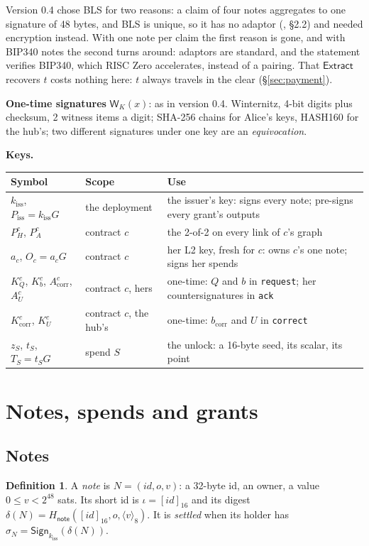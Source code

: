 \documentclass[11pt]{article}
\theoremstyle{plain}
\theoremstyle{definition}
\newtheorem{definition}{Definition}
\newcommand{\bcorr}{b_{\mathrm{corr}}}
\newcommand{\tx}[1]{\texttt{#1}}
\newcommand{\be}[2]{\langle #1\rangle_{#2}}
\newcommand{\pre}[2]{[#1]_{#2}}
\newcommand{\Ht}[1]{H_{\textsf{#1}}}
\newcommand{\Sign}{\mathsf{Sign}}
\newcommand{\Extr}{\mathsf{Extract}}
\newcommand{\Wots}{\mathsf{W}}
\newcommand{\kiss}{k_{\mathrm{iss}}}
\newcommand{\Piss}{P_{\mathrm{iss}}}
\newcommand{\PH}{P_H^{c}}
\newcommand{\Oc}{O_c}
\newcommand{\KQ}{K_{Q}^{c}}
\newcommand{\Kb}{K_{b}^{c}}
\newcommand{\Kcorr}{K_{\mathrm{corr}}^{c}}
\newcommand{\KU}{K_{U}^{c}}
\newcommand{\Acorr}{A_{\mathrm{corr}}^{c}}
\newcommand{\AU}{A_{U}^{c}}
\begin{document}
Version 0.4 chose BLS for two reasons: a claim of four notes aggregates
to one signature of 48 bytes, and BLS is unique, so it has no adaptor
(\cite{grants04}, \S2.2) and needed encryption instead. With one note
per claim the first reason is gone, and with BIP340 notes the second
turns around: adaptors are standard, and the statement verifies
BIP340, which RISC Zero accelerates, instead of a pairing. That $\Extr$
recovers $t$ costs nothing here: $t$ always travels in the clear
(\S\ref{sec:payment}).

\textbf{One-time signatures} $\Wots_K(x)$: as in version 0.4. Winternitz,
4-bit digits plus checksum, 2 witness items a digit; SHA-256 chains for
Alice's keys, HASH160 for the hub's; two different signatures under one
key are an \emph{equivocation}.

\textbf{Keys.}
\begin{center}
\begin{tabularx}{\linewidth}{llL}
\toprule
Symbol & Scope & Use \\
\midrule
$\kiss$, $\Piss = \kiss G$ & the deployment & the issuer's key: signs every note; pre-signs every grant's outputs \\
$\PH$, $P_A^c$ & contract $c$ & the 2-of-2 on every link of $c$'s graph \\
$a_c$, $\Oc = a_cG$ & contract $c$ & her L2 key, fresh for $c$: owns $c$'s one note; signs her spends \\
$\KQ$, $\Kb$, $\Acorr$, $\AU$ & contract $c$, hers & one-time: $Q$ and $b$ in \tx{request}; her countersignatures in \tx{ack} \\
$\Kcorr$, $\KU$ & contract $c$, the hub's & one-time: $\bcorr$ and $U$ in \tx{correct} \\
$z_S$, $t_S$, $T_S = t_S G$ & spend $S$ & the unlock: a 16-byte seed, its scalar, its point \\
\bottomrule
\end{tabularx}
\end{center}

\section{Notes, spends and grants}

\subsection{Notes}

\begin{definition}
A \emph{note} is $N = (\mathit{id}, o, v)$: a 32-byte id, an owner, a
value $0 \le v < 2^{48}$ sats. Its short id is $\iota =
\pre{\mathit{id}}{16}$ and its digest $\delta(N) =
\Ht{note}(\pre{\mathit{id}}{16}, o, \be{v}{8})$. It is \emph{settled}
when its holder has $\sigma_N = \Sign_{\kiss}(\delta(N))$.
\end{definition}
\end{document}
